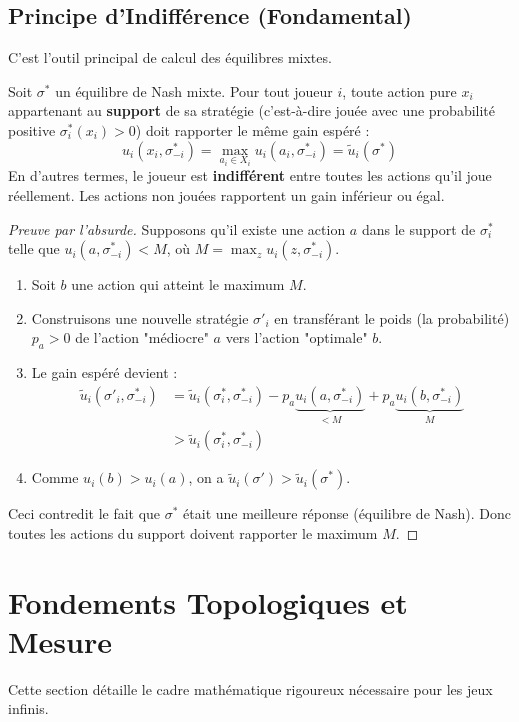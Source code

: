 \subsection{Principe d'Indifférence (Fondamental)}
C'est l'outil principal de calcul des équilibres mixtes.

\begin{proposition}
Soit $\sigma^*$ un équilibre de Nash mixte. Pour tout joueur $i$, toute action pure $x_i$ appartenant au \textbf{support} de sa stratégie (c'est-à-dire jouée avec une probabilité positive $\sigma^*_i(x_i) > 0$) doit rapporter le même gain espéré :
$$u_i(x_i, \sigma^*_{-i}) = \max_{a_i \in X_i} u_i(a_i, \sigma^*_{-i}) = \tilde{u}_i(\sigma^*)$$
En d'autres termes, le joueur est \textbf{indifférent} entre toutes les actions qu'il joue réellement. Les actions non jouées rapportent un gain inférieur ou égal.
\end{proposition}

\begin{proof}[Preuve par l'absurde]
Supposons qu'il existe une action $a$ dans le support de $\sigma_i^*$ telle que $u_i(a, \sigma^*_{-i}) < M$, où $M = \max_{z} u_i(z, \sigma^*_{-i})$.
\begin{enumerate}
    \item Soit $b$ une action qui atteint le maximum $M$.
    \item Construisons une nouvelle stratégie $\sigma'_i$ en transférant le poids (la probabilité) $p_a > 0$ de l'action "médiocre" $a$ vers l'action "optimale" $b$.
    \item Le gain espéré devient :
    \begin{align*}
    \tilde{u}_i(\sigma'_i, \sigma^*_{-i}) &= \tilde{u}_i(\sigma^*_i, \sigma^*_{-i}) - p_a \underbrace{u_i(a, \sigma^*_{-i})}_{< M} + p_a \underbrace{u_i(b, \sigma^*_{-i})}_{M} \\
    &> \tilde{u}_i(\sigma^*_i, \sigma^*_{-i})
    \end{align*}
    \item Comme $u_i(b) > u_i(a)$, on a $\tilde{u}_i(\sigma') > \tilde{u}_i(\sigma^*)$.
\end{enumerate}
Ceci contredit le fait que $\sigma^*$ était une meilleure réponse (équilibre de Nash). Donc toutes les actions du support doivent rapporter le maximum $M$.
\end{proof}

\section{Fondements Topologiques et Mesure}
Cette section détaille le cadre mathématique rigoureux nécessaire pour les jeux infinis.

